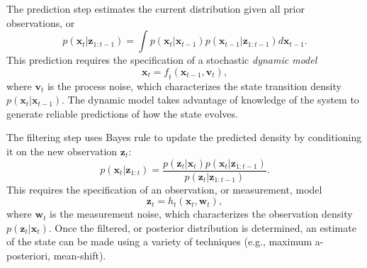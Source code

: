 The prediction step estimates the current distribution given all prior observations, or
\begin{equation} \label{eqn:prior}
\mathit{p}(\mathbf{x}_t|\mathbf{z}_{1:t-1}) =  \int{ \mathit{p}(\mathbf{x}_t|\mathbf{x}_{t-1})\mathit{p}(\mathbf{x}_{t-1}|\mathbf{z}_{1:t-1}) \mathit{d}\mathbf{x}_{t-1}}. 
\end{equation}
This prediction requires the specification of a stochastic \textit{dynamic model} 
\begin{equation} 
\mathbf{x}_t = \mathit{f}_t(\mathbf{x}_{t-1},\mathbf{v}_t) ,
\end{equation}
where $\mathbf{v}_t$ is the process noise, which characterizes the state transition density $\mathit{p}(\mathbf{x}_t|\mathbf{x}_{t-1})$. The dynamic model takes advantage of knowledge of the system to generate reliable predictions of how the state evolves. 

The filtering step uses Bayes rule to update the predicted density by conditioning it on the new observation $\mathbf{z}_t$:
\begin{equation} \label{eqn:posterior}
\mathit{p}(\mathbf{x}_t|\mathbf{z}_{1:t}) =  \frac{ \mathit{p}(\mathbf{z}_t|\mathbf{x}_{t})\mathit{p}(\mathbf{x}_{t}|\mathbf{z}_{1:t-1})} {\mathit{p}(\mathbf{z}_{t}|\mathbf{z}_{1:t-1})}. 
\end{equation}
This requires the specification of an observation, or measurement, model
\begin{equation} 
\mathbf{z}_t = \mathit{h}_t(\mathbf{x}_{t},\mathbf{w}_t) ,
\end{equation}
where $\mathbf{w}_t$ is the measurement noise, which characterizes the observation density $\mathit{p}(\mathbf{z}_t|\mathbf{x}_{t})$. Once the filtered, or posterior distribution is determined, an estimate of the state can be made using a variety of techniques (e.g., maximum a-posteriori, mean-shift). 

